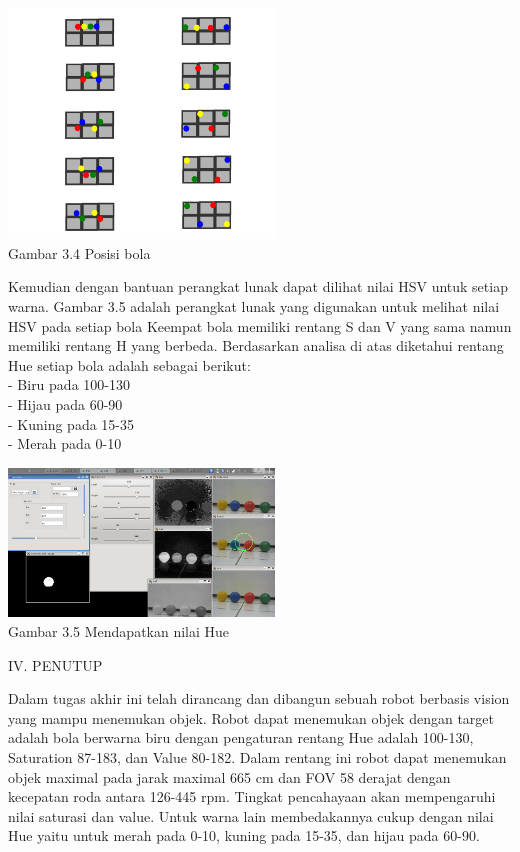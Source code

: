 \documentclass[10pt,journal,compsoc]{IEEEtran}
\begin{document}
  \begin{center}
    \includegraphics[width=200pt]{ball_pos}\\
    Gambar 3.4 Posisi bola
  \end{center}
  
  Kemudian dengan bantuan perangkat lunak dapat dilihat nilai HSV untuk setiap warna.
  Gambar 3.5 adalah perangkat lunak yang digunakan untuk melihat nilai HSV pada setiap bola
  Keempat bola memiliki rentang S dan V yang sama namun memiliki rentang H yang berbeda.
  Berdasarkan analisa di atas diketahui rentang Hue setiap bola adalah sebagai berikut:\\
  - Biru pada 100-130 \\
  - Hijau pada 60-90 \\
  - Kuning pada 15-35 \\
  - Merah pada 0-10 \\

  \begin{center}
    \includegraphics[width=200pt]{ball_color}\\
    Gambar 3.5 Mendapatkan nilai Hue
  \end{center}
  
  \begin{center}
     IV. PENUTUP
  \end{center}
  
  Dalam tugas akhir ini telah dirancang dan dibangun sebuah robot berbasis vision yang mampu menemukan objek. 
  Robot dapat menemukan objek dengan target adalah bola berwarna biru dengan pengaturan rentang Hue adalah 100-130, Saturation 87-183, dan Value 80-182.
  Dalam rentang ini robot dapat menemukan objek maximal pada jarak maximal 665 cm dan FOV 58 derajat dengan kecepatan roda antara 126-445 rpm. 
  Tingkat pencahayaan akan mempengaruhi nilai saturasi dan value. Untuk warna lain membedakannya cukup dengan nilai Hue yaitu untuk merah pada 0-10, kuning pada 15-35, dan hijau pada 60-90.
  
\end{document}
